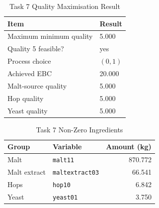 \begin{table}[H]
\renewcommand{\arraystretch}{1.15}
\caption{Task 7 Quality Maximisation Result}
\label{tab:task37-quality}
\centering
\small
\begin{tabular}{@{}ll@{}}
\toprule
Item & Result \\
\midrule
Maximum minimum quality & 5.000 \\
Quality 5 feasible? & yes \\
Process choice & $(0,1)$ \\
Achieved EBC & 20.000 \\
Malt-source quality & 5.000 \\
Hop quality & 5.000 \\
Yeast quality & 5.000 \\
\bottomrule
\end{tabular}
\end{table}

\begin{table}[H]
\renewcommand{\arraystretch}{1.15}
\caption{Task 7 Non-Zero Ingredients}
\label{tab:task37-ingredients}
\centering
\small
\begin{tabular}{@{}llr@{}}
\toprule
Group & Variable & Amount (kg) \\
\midrule
Malt & \texttt{malt11} & 870.772 \\
Malt extract & \texttt{maltextract03} & 66.541 \\
Hops & \texttt{hop10} & 6.842 \\
Yeast & \texttt{yeast01} & 3.750 \\
\bottomrule
\end{tabular}
\end{table}

